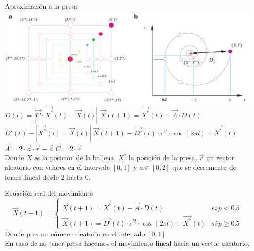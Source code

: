 \documentclass[10pt]{beamer}
\begin{document}
	\begin{frame}[fragile]{Aproximación a la presa}
		\includegraphics[scale=0.23]{./Imagenes/imagen3.png}
		\pause
		\vspace{5px}
		$D(t) = |\vec{C}\cdot \vec{X^*}(t)-\vec{X}(t)|$ \hspace{20px} $\vec{X}(t+1) = \vec{X^*}(t)-\vec{A}\cdot D(t)$ \\
		\pause
		$D'(t) = |\vec{X^*}(t)-\vec{X}(t)|$ \hspace{20px} $\vec{X}(t+1) = \vec{D'}(t)\cdot e^{bl}\cdot \cos (2\pi l)+\vec{X^*}(t)$ \\
		\vspace{10px}
		$\vec{A} = 2\cdot \vec{a}\cdot \vec{r}-\vec{a}$ \hspace{20px} $\vec{C}=2\cdot \vec{r}$ \\
		\pause
		Donde $X$ es la posición de la ballena, $X^*$ la posición de la presa, $\vec{r}$ un vector aleatorio con valores en el intervalo $[0,1]$ y $a\in [0,2]$ que se decrementa de forma lineal desde 2 hasta 0.
	\end{frame}
	
	\begin{frame}[fragile]{Ecuación real del movimiento}
		\pause
		$$
		\vec{X}(t+1)=
		\begin{cases}
		\vec{X}(t+1) = \vec{X^*}(t)-\vec{A}\cdot D(t) & si \ p<0.5\\
		\vec{X}(t+1) = \vec{D'}(t)\cdot e^{bl}\cdot \cos (2\pi l)+\vec{X^*}(t) & si \ p \geq 0.5
		\end{cases}
		$$
		\pause
		Donde p es un número aleatorio en el intervalo $[0,1]$ \\
		\pause
		En caso de no tener presa hacemos el movimiento lineal hacia un vector aleatorio.
	\end{frame}
	
\end{document}

